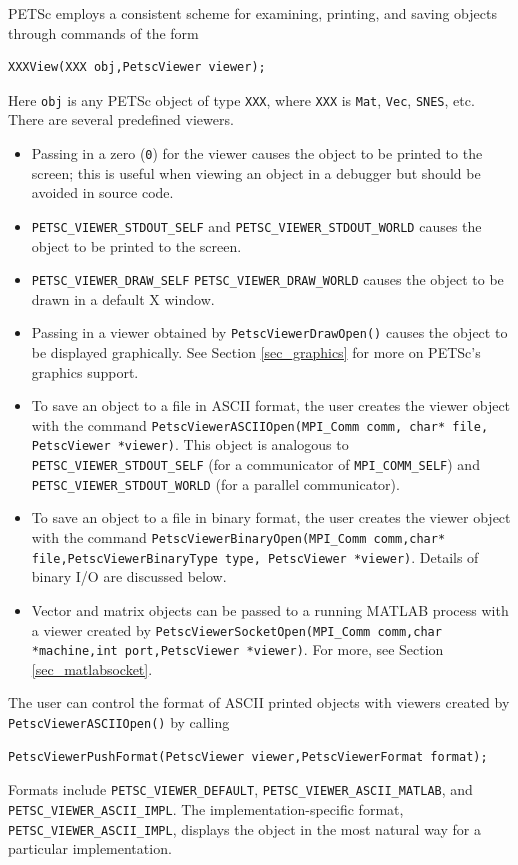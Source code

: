 {{PETSc employs a consistent scheme for examining, printing, and
saving objects through commands of the form
\begin{lstlisting}
XXXView(XXX obj,PetscViewer viewer);
\end{lstlisting}
Here \lstinline{obj} is any PETSc object of type
\lstinline{XXX},  where \lstinline{XXX}
is \lstinline{Mat}, \lstinline{Vec}, \lstinline{SNES}, etc. There are several
predefined viewers.
\begin{itemize}
  \item Passing in a zero (\lstinline{0}) for the viewer causes the object to be printed
      to the screen; this is useful when viewing an object in
      a debugger but should be avoided in source code.
    \item \lstinline{PETSC_VIEWER_STDOUT_SELF} and
      \lstinline{PETSC_VIEWER_STDOUT_WORLD}
      causes the object to be printed to the screen.
    \item \lstinline{PETSC_VIEWER_DRAW_SELF}
      \lstinline{PETSC_VIEWER_DRAW_WORLD} causes the
      object to be drawn in a default X window. 
\item Passing in a viewer obtained by
      \lstinline{PetscViewerDrawOpen()} causes the object to be displayed graphically.
      See Section \ref{sec_graphics} for more on PETSc's graphics support.
\item To save an object to a file in ASCII format, the user creates
      the viewer object with the command
      \lstinline{PetscViewerASCIIOpen(MPI_Comm comm, char* file, PetscViewer *viewer)}.
      This object is
      analogous to \lstinline{PETSC_VIEWER_STDOUT_SELF} (for a communicator of
      \lstinline{MPI_COMM_SELF}) and
      \lstinline{PETSC_VIEWER_STDOUT_WORLD} (for a parallel communicator).
\item To save an object to a file in binary format, the user creates
      the viewer object with the command
      \lstinline{PetscViewerBinaryOpen(MPI_Comm comm,char* file,PetscViewerBinaryType type, PetscViewer *viewer)}. Details of binary
      I/O are discussed below.
\item Vector and matrix objects can be passed to a running MATLAB process
      with a viewer created by
    \lstinline{PetscViewerSocketOpen(MPI_Comm comm,char *machine,int port,PetscViewer *viewer)}.
    For more, see Section \ref{sec_matlabsocket}.
\end{itemize}

The user can control the format of ASCII printed objects with viewers
created by \break\lstinline{PetscViewerASCIIOpen()} by calling
\begin{lstlisting}
PetscViewerPushFormat(PetscViewer viewer,PetscViewerFormat format);
\end{lstlisting}
 
Formats include
\lstinline{PETSC_VIEWER_DEFAULT}, \lstinline{PETSC_VIEWER_ASCII_MATLAB}, and
\lstinline{PETSC_VIEWER_ASCII_IMPL}.  The implementation-specific format,
\lstinline{PETSC_VIEWER_ASCII_IMPL}, displays the object in the most natural way
for a particular implementation.

}}
